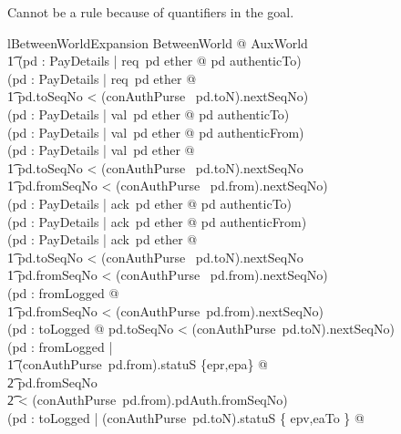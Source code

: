 Cannot be a rule because of quantifiers in the goal.
%
\begin{LNewLemma}
\begin{theorem}{lBetweenWorldExpansion}
    \forall BetweenWorld @
    AuxWorld \land \\ \t1
    (\forall pd : PayDetails | req~pd \in ether @ pd \in authenticTo) \\
    \land
    (\forall pd : PayDetails | req~pd \in ether @ \\
        \t1 pd.toSeqNo < (conAuthPurse~ pd.toN).nextSeqNo) \\
    \land
    (\forall pd : PayDetails | val~pd \in ether @ pd \in authenticTo) \\
    \land
    (\forall pd : PayDetails | val~pd \in ether @ pd \in authenticFrom) \\
    \land
    (\forall pd : PayDetails | val~pd \in ether @ \\
        \t1 pd.toSeqNo < (conAuthPurse~ pd.toN).nextSeqNo \\
        \t1 \land pd.fromSeqNo < (conAuthPurse~ pd.from).nextSeqNo) \\
    \land
    (\forall pd : PayDetails | ack~pd \in ether @ pd \in authenticTo) \\
    \land
    (\forall pd : PayDetails | ack~pd \in ether @ pd \in authenticFrom) \\
    \land
    (\forall pd : PayDetails | ack~pd \in ether @ \\
        \t1 pd.toSeqNo < (conAuthPurse~ pd.toN).nextSeqNo  \\ %
        \t1 \land pd.fromSeqNo < (conAuthPurse~ pd.from).nextSeqNo) \\
    \land %
    (\forall pd : fromLogged @  \\ %
        \t1 pd.fromSeqNo < (conAuthPurse~pd.from).nextSeqNo) \\
    \land %
    (\forall pd : toLogged @ pd.toSeqNo < (conAuthPurse~pd.toN).nextSeqNo) \\
    \land %
    (\forall pd : fromLogged | \\ %
        \t1 (conAuthPurse~pd.from).statuS \in \{epr,epa\} @  \\ %
        \t2 pd.fromSeqNo \\ %
        \t2 < (conAuthPurse~pd.from).pdAuth.fromSeqNo) \\
    \land %
    (\forall pd : toLogged | (conAuthPurse~pd.toN).statuS \in \{ epv,eaTo \} @ \\ %

\end{theorem}
\end{LNewLemma}
